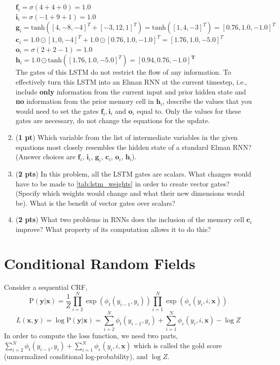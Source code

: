 \documentclass[11pt, letterpaper]{article}
\begin{document}
\begin{enumerate}[label=(\alph*)]
$\boldsymbol{f}_{i} = \sigma(4 + 4 + 0) = 1.0$ \\
\indent $\boldsymbol{i}_{i} = \sigma(-1 + 9 + 1) = 1.0$ \\
\indent $\boldsymbol{g}_{i} = \text{tanh}([4, -8, -4]^T + [-3, 12, 1]^T) = \text{tanh}([1,4,-3]^T) = [0.76, 1.0, -1.0]^T$\\
\indent $\boldsymbol{c}_{i} = 1.0 \odot [1,0,-4]^T + 1.0 \odot [0.76, 1.0, -1.0]^T = [1.76, 1.0, -5.0]^T $ \\
\indent $\boldsymbol{o}_{i} = \sigma(2 + 2 - 1) = 1.0$\\
\indent $\boldsymbol{h}_{i} = 1.0 \odot \text{tanh}([1.76, 1.0, -5.0]^T) = \mathbf{[0.94, 0.76, -1.0]^T}$\\

The gates of this LSTM do not restrict the flow of any information. To effectively turn this LSTM into an Elman RNN at the current timestep, i.e., include \textbf{only} information from the current input and prior hidden state and \textbf{no} information from the prior memory cell in $\boldsymbol{h}_{i}$, describe the values that you would need to set the gates $\boldsymbol{f}_{i}, \boldsymbol{i}_{i}$ and $\boldsymbol{o}_{i}$ equal to. Only the values for these gates are necessary, do not change the equations for the update.

\item (\textbf{1 pt})  Which variable from the list of intermediate variables in the given equations most closely resembles the hidden state of a standard Elman RNN? (Answer choices are $\boldsymbol{f}_{i}$, $\boldsymbol{i}_{i}$, $\boldsymbol{g}_{i}$, $\boldsymbol{c}_{i}$, $\boldsymbol{o}_{i}$, $\boldsymbol{h}_{i}$).

\item (\textbf{2 pts})  In this problem, all the LSTM gates are scalars. What changes would have to be made to \autoref{tab:lstm_weights} in order to create vector gates? (Specify which weights would change and what their new dimensions would be). What is the benefit of vector gates over scalars?

\item (\textbf{2 pts})   What two problems in RNNs does the inclusion of the memory cell $\boldsymbol{c}_{i}$ improve? What property of its computation allows it to do this?

\end{enumerate}

\section{Conditional Random Fields}
Consider a sequential CRF,
        $$
        \mathrm P(\mathbf{y}|\mathbf{x}) = \frac{1}{Z}\prod_{i=2}^N \exp(\phi_t(y_{i-1}, y_i))\prod_{i=1}^N\exp(\phi_e(y_i, i, \mathbf{x}))
        $$
        $$
        L(\mathbf{x}, \mathbf{y})  = \log \mathrm P(\mathbf{y}|\mathbf{x}) = \sum_{i=2}^N \phi_t(y_{i-1}, y_i) + \sum_{i=1}^N\phi_e(y_i, i, \mathbf{x}) - \log Z
        $$
        In order to compute the loss function, we need two parts, $\sum_{i=2}^N \phi_t(y_{i-1}, y_i) + \sum_{i=1}^N\phi_e(y_i, i, \mathbf{x})$ which is called the gold score (unnormalized conditional log-probability), and $\log Z$.
\end{document}
